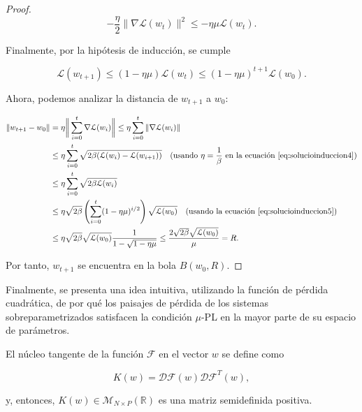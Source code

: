 \begin{proof}
    \begin{equation}\label{eq:solucioinduccion5}
        - \frac{\eta}{2} \| \nabla \mathcal{L}(w_{t}) \|^2 \leq -\eta \mu \mathcal{L}(w_{t}).
    \end{equation}

    Finalmente, por la hipótesis de inducción, se cumple

    \begin{equation}\label{eq:solucioinduccion6}
        \mathcal{L}(w_{t+1}) \leq (1 - \eta \mu)\mathcal{L}(w_{t}) \leq (1 - \eta \mu)^{t+1}\mathcal{L}(w_0).
    \end{equation}

    Ahora, podemos analizar la distancia de $w_{t+1}$ a $w_0$:

    \begin{align}
        \| w_{t+1} - w_0 \| &= \eta \bigg\| \sum_{i=0}^{t} \nabla \mathcal{L}(w_i) \bigg\| \leq \eta \sum_{i=0}^{t} \| \nabla \mathcal{L}(w_i) \| \\
        &\leq \eta \sum_{i=0}^{t} \sqrt{2 \beta (\mathcal{L}(w_i) - \mathcal{L}(w_{i+1}))} \quad \text{(usando $\eta = \frac{1}{\beta}$ en la ecuación~\eqref{eq:solucioinduccion4})} \\
        &\leq \eta \sum_{i=0}^{t} \sqrt{2 \beta \mathcal{L}(w_i)} \\
        &\leq \eta \sqrt{2\beta} \left( \sum_{i=0}^{t} (1 - \eta \mu)^{i/2} \right) \sqrt{\mathcal{L}(w_0)} \quad \text{(usando la ecuación~\eqref{eq:solucioinduccion5})} \\
        &\leq \eta \sqrt{2\beta} \sqrt{\mathcal{L}(w_0)} \frac{1}{1 - \sqrt{1 - \eta \mu}} \leq \frac{2 \sqrt{2\beta} \sqrt{\mathcal{L}(w_0)}}{\mu} = R.
    \end{align}

    Por tanto, $w_{t+1}$ se encuentra en la bola $B(w_0, R)$.
\end{proof}

Finalmente, se presenta una idea intuitiva, utilizando la función de pérdida cuadrática, de por qué los paisajes de pérdida de los sistemas sobreparametrizados satisfacen la condición $\mu$-PL en la mayor parte de su espacio de parámetros.

\begin{definicion}
    El núcleo tangente de la función $\mathcal{F}$ en el vector $w$ se define como

    \[
        K(w) = \mathcal{DF}(w)\mathcal{DF}^{T}(w),
    \]

    y, entonces, $K(w) \in \mathcal{M}_{N \times P}(\mathbb{R})$ es una matriz semidefinida positiva.
\end{definicion}

